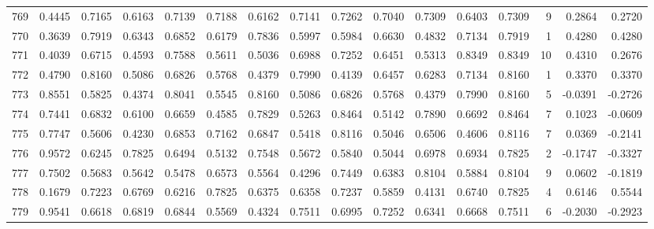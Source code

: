 \begin{tabular}{lrrrrrrrrrrrrrrr}
769 &      0.4445 &  0.7165 &  0.6163 &  0.7139 &  0.7188 &  0.6162 &  0.7141 &  0.7262 &  0.7040 &  0.7309 &   0.6403 &     0.7309 &      9 &                    0.2864 &                     0.2720 \\
770 &      0.3639 &  0.7919 &  0.6343 &  0.6852 &  0.6179 &  0.7836 &  0.5997 &  0.5984 &  0.6630 &  0.4832 &   0.7134 &     0.7919 &      1 &                    0.4280 &                     0.4280 \\
771 &      0.4039 &  0.6715 &  0.4593 &  0.7588 &  0.5611 &  0.5036 &  0.6988 &  0.7252 &  0.6451 &  0.5313 &   0.8349 &     0.8349 &     10 &                    0.4310 &                     0.2676 \\
772 &      0.4790 &  0.8160 &  0.5086 &  0.6826 &  0.5768 &  0.4379 &  0.7990 &  0.4139 &  0.6457 &  0.6283 &   0.7134 &     0.8160 &      1 &                    0.3370 &                     0.3370 \\
773 &      0.8551 &  0.5825 &  0.4374 &  0.8041 &  0.5545 &  0.8160 &  0.5086 &  0.6826 &  0.5768 &  0.4379 &   0.7990 &     0.8160 &      5 &                   -0.0391 &                    -0.2726 \\
774 &      0.7441 &  0.6832 &  0.6100 &  0.6659 &  0.4585 &  0.7829 &  0.5263 &  0.8464 &  0.5142 &  0.7890 &   0.6692 &     0.8464 &      7 &                    0.1023 &                    -0.0609 \\
775 &      0.7747 &  0.5606 &  0.4230 &  0.6853 &  0.7162 &  0.6847 &  0.5418 &  0.8116 &  0.5046 &  0.6506 &   0.4606 &     0.8116 &      7 &                    0.0369 &                    -0.2141 \\
776 &      0.9572 &  0.6245 &  0.7825 &  0.6494 &  0.5132 &  0.7548 &  0.5672 &  0.5840 &  0.5044 &  0.6978 &   0.6934 &     0.7825 &      2 &                   -0.1747 &                    -0.3327 \\
777 &      0.7502 &  0.5683 &  0.5642 &  0.5478 &  0.6573 &  0.5564 &  0.4296 &  0.7449 &  0.6383 &  0.8104 &   0.5884 &     0.8104 &      9 &                    0.0602 &                    -0.1819 \\
778 &      0.1679 &  0.7223 &  0.6769 &  0.6216 &  0.7825 &  0.6375 &  0.6358 &  0.7237 &  0.5859 &  0.4131 &   0.6740 &     0.7825 &      4 &                    0.6146 &                     0.5544 \\
779 &      0.9541 &  0.6618 &  0.6819 &  0.6844 &  0.5569 &  0.4324 &  0.7511 &  0.6995 &  0.7252 &  0.6341 &   0.6668 &     0.7511 &      6 &                   -0.2030 &                    -0.2923 \\

\end{tabular}
